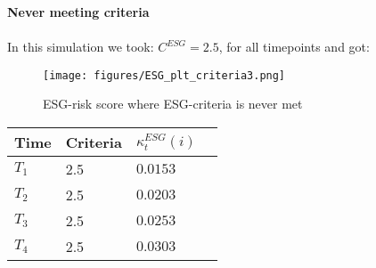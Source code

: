 \textbf{Never meeting criteria}
\\~\\ 
In this simulation we took: $C^{ESG} = 2.5$, for all timepoints and got: 

\begin{figure}[htp]
    \centering
    \texttt{[image: figures/ESG\_plt\_criteria3.png]}
    \caption{ESG-risk score where ESG-criteria is never met}
    \label{fig: ESG-risk_score_criteria3}
\end{figure}




\begin{center}
    \begin{tabular}{ | l | l | l | p{5cm} |}
    \hline
    Time    & Criteria  & $\kappa_{t}^{ESG}(i)$ \\ \hline
    $T_{1}$ &    2.5    & $0.0153$  \\ \hline
    $T_{2}$ &    2.5    & $0.0203$  \\ \hline
    $T_{3}$ &    2.5    & $0.0253$\\ \hline
    $T_{4}$ &    2.5    & $0.0303$ \\ \hline
    \end{tabular}
\end{center} 












